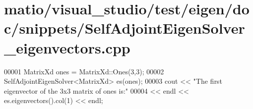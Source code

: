 \hypertarget{matio_2visual__studio_2test_2eigen_2doc_2snippets_2_self_adjoint_eigen_solver__eigenvectors_8cpp_source}{}\section{matio/visual\+\_\+studio/test/eigen/doc/snippets/\+Self\+Adjoint\+Eigen\+Solver\+\_\+eigenvectors.cpp}
\label{matio_2visual__studio_2test_2eigen_2doc_2snippets_2_self_adjoint_eigen_solver__eigenvectors_8cpp_source}

\begin{DoxyCode}
00001 MatrixXd ones = MatrixXd::Ones(3,3);
00002 SelfAdjointEigenSolver<MatrixXd> es(ones);
00003 cout << \textcolor{stringliteral}{"The first eigenvector of the 3x3 matrix of ones is:"} 
00004      << endl << es.eigenvectors().col(1) << endl;
\end{DoxyCode}
